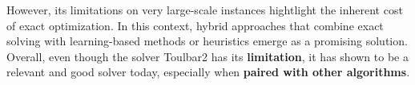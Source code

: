 \documentclass[20pt, a0paper, landscape, margin=1.5cm, colspace=1.5cm, blockverticalspace=1.5cm]{tikzposter}
\begin{document}
\begin{columns}
{        However, its limitations on very large-scale instances hightlight the inherent cost of exact optimization. In this context, hybrid approaches that combine exact solving with learning-based methods or heuristics emerge as a promising solution.
        Overall, even though the solver Toulbar2 has its \textbf{limitation}, it has shown to be a relevant and good solver today, especially when \textbf{paired with other algorithms}.
        
    }

    {

    }
\end{columns}
\end{document}
